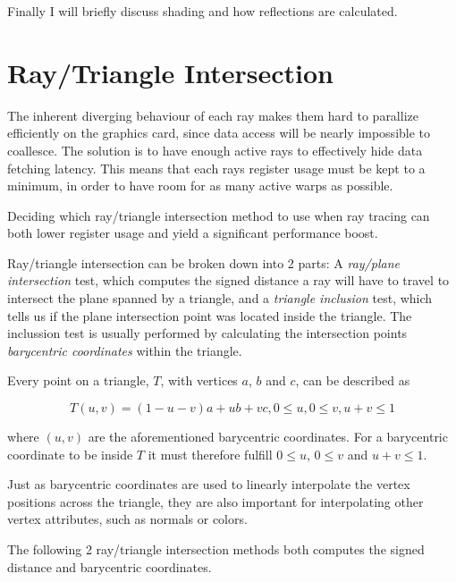 Finally I will briefly discuss shading and how reflections are
calculated.

\section{Ray/Triangle Intersection}

The inherent diverging behaviour of each ray makes them hard to
parallize efficiently on the graphics card, since data access will be
nearly impossible to coallesce. The solution is to have enough active
rays to effectively hide data fetching latency. This means that each
rays register usage must be kept to a minimum, in order to have room
for as many active warps as possible.

Deciding which ray/triangle intersection method to use when ray
tracing can both lower register usage and yield a significant
performance boost.


Ray/triangle intersection can be broken down into 2 parts: A
\textit{ray/plane intersection} test, which computes the signed
distance a ray will have to travel to intersect the plane spanned by a
triangle, and a \textit{triangle inclusion} test, which tells us if
the plane intersection point was located inside the triangle. The
inclussion test is usually performed by calculating the
intersection points \textit{barycentric coordinates} within the
triangle.

Every point on a triangle, $T$, with vertices $a$, $b$ and $c$, can be
described as

\begin{displaymath}
  T(u,v) = (1-u-v)a + ub + vc, 0 \le u, 0 \le v, u+v \le 1
\end{displaymath}
 
where $(u, v)$ are the aforementioned barycentric coordinates. For a
barycentric coordinate to be inside $T$ it must therefore fulfill $0
\le u$, $0 \le v$ and $u+v \le 1$.

Just as barycentric coordinates are used to linearly interpolate the
vertex positions across the triangle, they are also important for
interpolating other vertex attributes, such as normals or colors.

The following 2 ray/triangle intersection methods both computes
the signed distance and barycentric coordinates.

